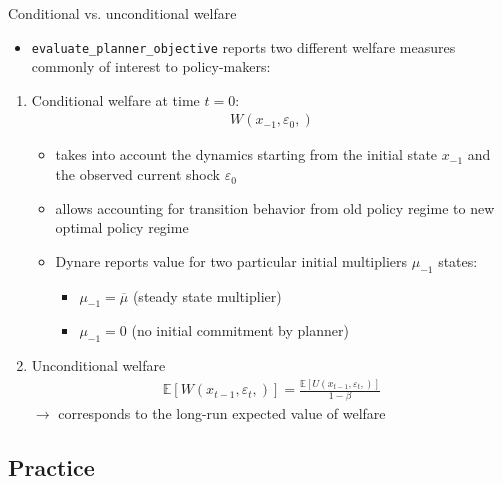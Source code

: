 \documentclass[handout,usepdftitle=false,xcolor=dvipsnames,aspectratio=169]{beamer}
\begin{document}
\begin{frame}{Conditional vs. unconditional welfare}
  \begin{itemize}
    \item \texttt{evaluate\_planner\_objective} reports two different welfare measures commonly of interest to policy-makers:
  \end{itemize}
          \begin{enumerate}
            \item Conditional welfare at time $t=0$:
                  \begin{align}
                    W \left( x_{-1}, \varepsilon_0, \right)
                  \end{align}

                  \begin{itemize}
                     \item takes into account the dynamics starting from the initial state $x_{-1}$ and the observed current shock $\varepsilon_0$
                     \item allows accounting for transition behavior from old policy regime to new optimal policy regime
                     \item Dynare reports value for two particular initial multipliers $\mu_{-1}$ states:
                           \begin{itemize}
                             \item $\mu_{-1} = \overline{\mu}$ (steady state multiplier)
                             \item $\mu_{-1} = 0$ (no initial commitment by planner)
                           \end{itemize}
                  \end{itemize}
            \item Unconditional welfare
                  \begin{align}
                    \mathbb{E}\left[ W\left( x_{t-1}, \varepsilon_t, \right) \right] = \frac{\mathbb{E}\left[U\left( x_{t-1}, \varepsilon_t, \right)\right]}{1-\beta}
                  \end{align}
                  $\rightarrow$ corresponds to the long-run expected value of welfare
          \end{enumerate}
\end{frame}


\subsection{Practice}
\end{document}
